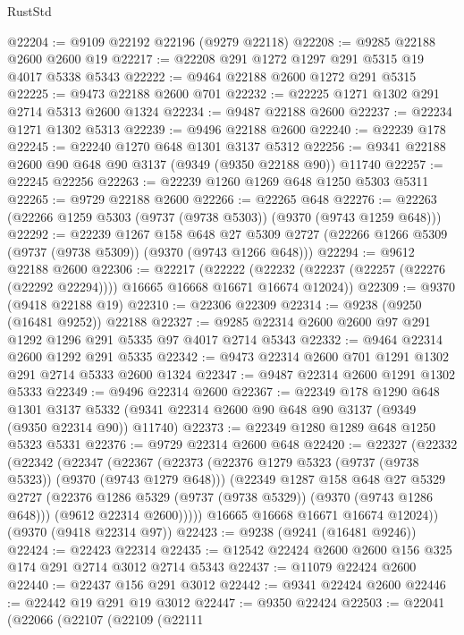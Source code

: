 \begin{lexlean}{RustStd}
\begin{coremodule}
{\begin{coremodule}
{{{{{{{{{{{{{{{{{{{{{{{{{{{{{{{{{{{{{{{@22204 := @9109 @22192 @22196 (@9279 @22118)
@22208 := @9285 @22188 @2600 @2600 @19
@22217 := @22208 @291 @1272 @1297 @291 @5315 @19 @4017 @5338 @5343
@22222 := @9464 @22188 @2600 @1272 @291 @5315
@22225 := @9473 @22188 @2600 @701
@22232 := @22225 @1271 @1302 @291 @2714 @5313 @2600 @1324
@22234 := @9487 @22188 @2600
@22237 := @22234 @1271 @1302 @5313
@22239 := @9496 @22188 @2600
@22240 := @22239 @178
@22245 := @22240 @1270 @648 @1301 @3137 @5312
@22256 := @9341 @22188 @2600 @90 @648 @90 @3137 (@9349 (@9350 @22188 @90)) @11740
@22257 := @22245 @22256
@22263 := @22239 @1260 @1269 @648 @1250 @5303 @5311
@22265 := @9729 @22188 @2600
@22266 := @22265 @648
@22276 := @22263 (@22266 @1259 @5303 (@9737 (@9738 @5303)) (@9370 (@9743 @1259 @648)))
@22292 := @22239
    @1267
    @158
    @648
    @27
    @5309
    @2727
    (@22266 @1266 @5309 (@9737 (@9738 @5309)) (@9370 (@9743 @1266 @648)))
@22294 := @9612 @22188 @2600
@22306 := @22217
    (@22222 (@22232 (@22237 (@22257 (@22276 (@22292 @22294)))) @16665 @16668 @16671 @16674 @12024))
@22309 := @9370 (@9418 @22188 @19)
@22310 := @22306 @22309
@22314 := @9238 (@9250 (@16481 @9252)) @22188
@22327 := @9285 @22314 @2600 @2600 @97 @291 @1292 @1296 @291 @5335 @97 @4017 @2714 @5343
@22332 := @9464 @22314 @2600 @1292 @291 @5335
@22342 := @9473 @22314 @2600 @701 @1291 @1302 @291 @2714 @5333 @2600 @1324
@22347 := @9487 @22314 @2600 @1291 @1302 @5333
@22349 := @9496 @22314 @2600
@22367 := @22349
    @178
    @1290
    @648
    @1301
    @3137
    @5332
    (@9341 @22314 @2600 @90 @648 @90 @3137 (@9349 (@9350 @22314 @90)) @11740)
@22373 := @22349 @1280 @1289 @648 @1250 @5323 @5331
@22376 := @9729 @22314 @2600 @648
@22420 := @22327
    (@22332
      (@22342
        (@22347
          (@22367
            (@22373
              (@22376 @1279 @5323 (@9737 (@9738 @5323)) (@9370 (@9743 @1279 @648)))
              (@22349
                @1287
                @158
                @648
                @27
                @5329
                @2727
                (@22376 @1286 @5329 (@9737 (@9738 @5329)) (@9370 (@9743 @1286 @648)))
                (@9612 @22314 @2600)))))
        @16665
        @16668
        @16671
        @16674
        @12024))
    (@9370 (@9418 @22314 @97))
@22423 := @9238 (@9241 (@16481 @9246))
@22424 := @22423 @22314
@22435 := @12542 @22424 @2600 @2600 @156 @325 @174 @291 @2714 @3012 @2714 @5343
@22437 := @11079 @22424 @2600
@22440 := @22437 @156 @291 @3012
@22442 := @9341 @22424 @2600
@22446 := @22442 @19 @291 @19 @3012
@22447 := @9350 @22424
@22503 := @22041
    (@22066
      (@22107
        (@22109
          (@22111
}}}}}}}}}}}}}}}}}}}}}}}}}}}}}}}}}}}}}}}
\end{coremodule}}
\end{coremodule}
\end{lexlean}
